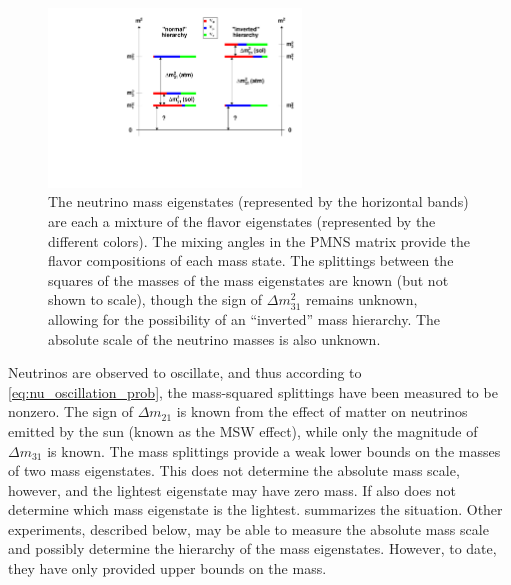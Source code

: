 \documentclass[herrin-thesis.tex]{subfiles}
\begin{document}
\begin{figure}[htb]
	\centering
	\includegraphics[width=0.6\textwidth]{./plots/nu_mixing.pdf}
	\caption[Neutrino mixing]{The neutrino mass eigenstates (represented by the horizontal bands) are each a mixture of the flavor eigenstates (represented by the different colors). The mixing angles in the PMNS matrix provide the flavor compositions of each mass state. The splittings between the squares of the masses of the mass eigenstates are known (but not shown to scale), though the sign of \(\Delta m_{31}^2\) remains unknown, allowing for the possibility of an ``inverted'' mass hierarchy. The absolute scale of the neutrino masses is also unknown.}
	\label{fig:nu_mixing}
\end{figure}

Neutrinos are observed to oscillate, and thus according to \cref{eq:nu_oscillation_prob}, the mass-squared splittings have been measured to be nonzero. The sign of \(\Delta m_{21}\) is known from the effect of matter on neutrinos emitted by the sun (known as the MSW effect), while only the magnitude of \(\Delta m_{31}\) is known. The mass splittings provide a weak lower bounds on the masses of two mass eigenstates. This does not determine the absolute mass scale, however, and the lightest eigenstate may have zero mass. If also does not determine which mass eigenstate is the lightest.  summarizes the situation. Other experiments, described below, may be able to measure the absolute mass scale and possibly determine the hierarchy of the mass eigenstates. However, to date, they have only provided upper bounds on the mass.
\end{document}
